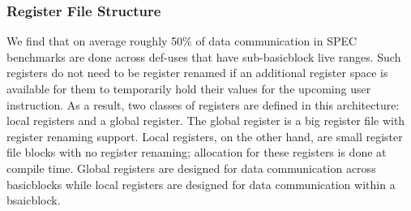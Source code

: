 \subsubsection{Register File Structure}
\label{sec:reg_files}

We find that on average roughly 50\% of data communication in SPEC benchmarks
are done across def-uses that have sub-basicblock live ranges. Such registers
do not need to be register renamed if an additional register space is available
for them to temporarily hold their values for the upcoming user instruction.  As
a result, two classes of registers are defined in this architecture: local registers
and a global register. The global register is a big register file with register
renaming support. Local registers, on the other hand, are small register
file blocks with no register renaming; allocation for these registers is
done at compile time.  Global registers are designed for data communication
across basicblocks while local registers are designed for data communication
within a bsaicblock.
